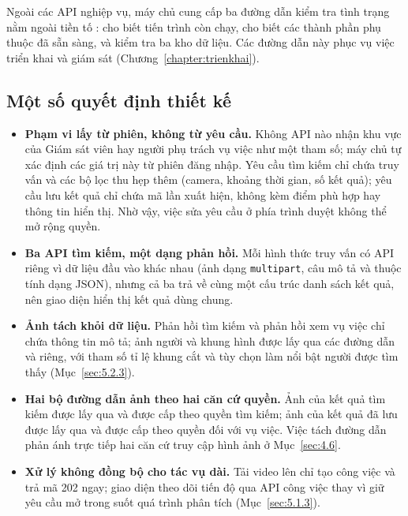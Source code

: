 Ngoài các API nghiệp vụ, máy chủ cung cấp ba đường dẫn kiểm tra tình trạng nằm ngoài tiền tố :  cho biết tiến trình còn chạy,  cho biết các thành phần phụ thuộc đã sẵn sàng, và  kiểm tra ba kho dữ liệu. Các đường dẫn này phục vụ việc triển khai và giám sát (Chương~\ref{chapter:trienkhai}).

\subsection{Một số quyết định thiết kế}
\label{sec:5.4.3}

\begin{itemize}
    \item \textbf{Phạm vi lấy từ phiên, không từ yêu cầu.} Không API nào nhận khu vực của Giám sát viên hay người phụ trách vụ việc như một tham số; máy chủ tự xác định các giá trị này từ phiên đăng nhập. Yêu cầu tìm kiếm chỉ chứa truy vấn và các bộ lọc thu hẹp thêm (camera, khoảng thời gian, số kết quả); yêu cầu lưu kết quả chỉ chứa mã lần xuất hiện, không kèm điểm phù hợp hay thông tin hiển thị. Nhờ vậy, việc sửa yêu cầu ở phía trình duyệt không thể mở rộng quyền.
    \item \textbf{Ba API tìm kiếm, một dạng phản hồi.} Mỗi hình thức truy vấn có API riêng vì dữ liệu đầu vào khác nhau (ảnh dạng \texttt{multipart}, câu mô tả và thuộc tính dạng JSON), nhưng cả ba trả về cùng một cấu trúc danh sách kết quả, nên giao diện hiển thị kết quả dùng chung.
    \item \textbf{Ảnh tách khỏi dữ liệu.} Phản hồi tìm kiếm và phản hồi xem vụ việc chỉ chứa thông tin mô tả; ảnh người và khung hình được lấy qua các đường dẫn  và  riêng, với tham số tỉ lệ khung cắt và tùy chọn làm nổi bật người được tìm thấy (Mục~\ref{sec:5.2.3}).
    \item \textbf{Hai bộ đường dẫn ảnh theo hai căn cứ quyền.} Ảnh của kết quả tìm kiếm được lấy qua  và được cấp theo quyền tìm kiếm; ảnh của kết quả đã lưu được lấy qua  và được cấp theo quyền đối với vụ việc. Việc tách đường dẫn phản ánh trực tiếp hai căn cứ truy cập hình ảnh ở Mục~\ref{sec:4.6}.
    \item \textbf{Xử lý không đồng bộ cho tác vụ dài.} Tải video lên chỉ tạo công việc và trả mã 202 ngay; giao diện theo dõi tiến độ qua API công việc thay vì giữ yêu cầu mở trong suốt quá trình phân tích (Mục~\ref{sec:5.1.3}).
\end{itemize}
